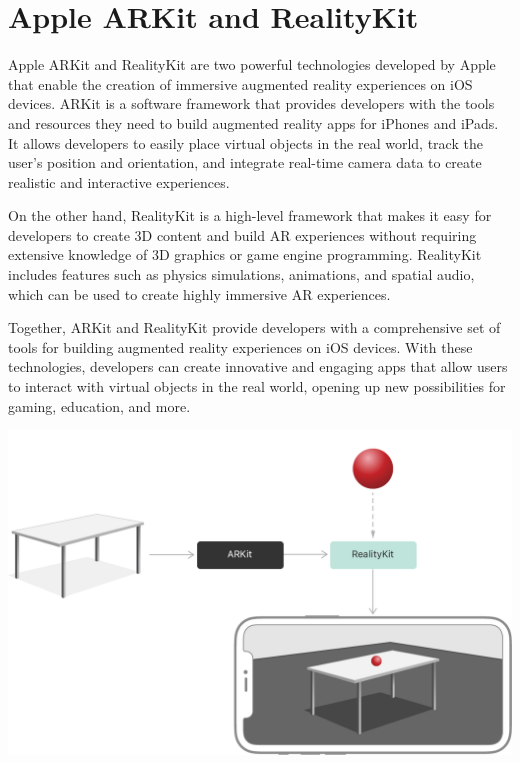 \documentclass{report}
\begin{document}
\section{Apple ARKit and RealityKit}

Apple ARKit and RealityKit are two powerful technologies developed by Apple that enable the creation of immersive augmented reality experiences on iOS devices. ARKit is a software framework that provides developers with the tools and resources they need to build augmented reality apps for iPhones and iPads. It allows developers to easily place virtual objects in the real world, track the user's position and orientation, and integrate real-time camera data to create realistic and interactive experiences.

On the other hand, RealityKit is a high-level framework that makes it easy for developers to create 3D content and build AR experiences without requiring extensive knowledge of 3D graphics or game engine programming. RealityKit includes features such as physics simulations, animations, and spatial audio, which can be used to create highly immersive AR experiences.

Together, ARKit and RealityKit provide developers with a comprehensive set of tools for building augmented reality experiences on iOS devices. With these technologies, developers can create innovative and engaging apps that allow users to interact with virtual objects in the real world, opening up new possibilities for gaming, education, and more.

\includegraphics[width=\textwidth]{realitykit.png}
\end{document}
